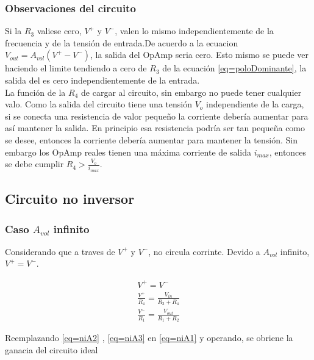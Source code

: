 \documentclass[../../main.tex]{subfiles}
\begin{document}




\subsubsection{Observaciones del circuito}
Si la $R_{3}$ valiese cero, $V^{+}$ y $V^{-}$, valen lo mismo independientemente de la frecuencia y de la tensión de entrada.De acuerdo a la ecuacion $V_{out}=A_{vol}(V^{+}-V^{-})$, la salida del OpAmp seria cero. Esto mismo se puede ver haciendo el limite tendiendo a cero de $R_{3}$ de la ecuación \ref{eq=poloDominante}, la salida del es cero independientemente de la entrada.
\\
La función de la $R_{4}$ de cargar al circuito, sin embargo no puede tener cualquier valo. Como la salida del circuito tiene una tensión $V_{o}$ independiente de la carga, si se conecta una resistencia de valor pequeño la corriente debería aumentar para así mantener la salida. En principio esa resistencia podría ser tan pequeña como se desee, entonces la corriente debería aumentar para mantener la tensión. Sin embargo los OpAmp reales tienen una máxima corriente de salida $i_{max}$, entonces se debe cumplir $R_{4}> \frac {V_{o}}{ i_{max}}$.




\subsection{Circuito no inversor}


\subsubsection{Caso $A_{vol}$ infinito}
Considerando que a traves de $V^{+}$ y $V^{-}$, no circula corrinte. Devido a  $A_{vol}$ infinito, $V^{+}=V^{-}$.

\begin{gather}
V^{+}=V^{-}\label{eq=niA1} \\
\frac{V^{+}}{R_{4}} =  \frac{V_{in}}{R_{3}+R_{4}}\label{eq=niA2}\\
\frac {V^{-}} {R_{1}}=\frac{V_{out}}{R_{1}+R_{2}}\label{eq=niA3}
\end{gather}

Reemplazando \ref{eq=niA2} , \ref{eq=niA3} en \ref{eq=niA1} y operando, se obriene la ganacia del circuito ideal
\end{document}
